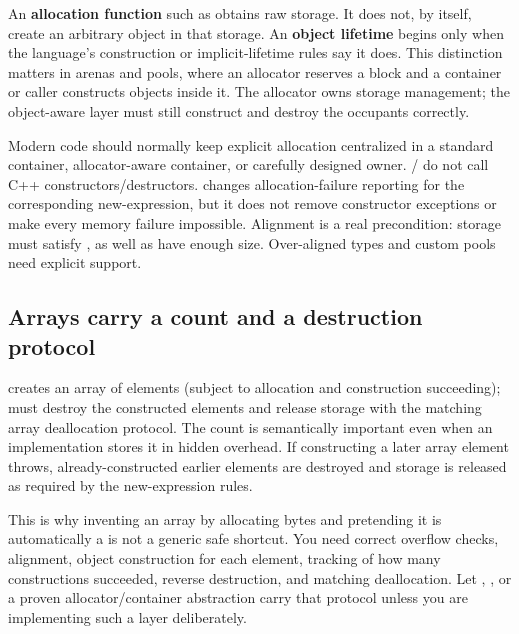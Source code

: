 An \textbf{allocation function} such as  obtains raw storage. It does not, by itself, create an arbitrary  object in that storage. An \textbf{object lifetime} begins only when the language's construction or implicit-lifetime rules say it does. This distinction matters in arenas and pools, where an allocator reserves a block and a container or caller constructs objects inside it. The allocator owns storage management; the object-aware layer must still construct and destroy the occupants correctly.

Modern code should normally keep explicit allocation centralized in a standard container, allocator-aware container, or carefully designed owner. / do not call C++ constructors/destructors.  changes allocation-failure reporting for the corresponding new-expression, but it does not remove constructor exceptions or make every memory failure impossible. Alignment is a real precondition: storage must satisfy , as well as have enough size. Over-aligned types and custom pools need explicit support.

\subsection{Arrays carry a count and a destruction protocol}\label{05-engine-i-ch004-arrays-carry-a-count-and-a-destruction-protocol}

\hypertarget{05-engine-i-ch004-arrays-carry-a-count-and-a-destruction-protocol}{}

 creates an array of  elements (subject to allocation and construction succeeding);  must destroy the constructed elements and release storage with the matching array deallocation protocol. The count is semantically important even when an implementation stores it in hidden overhead. If constructing a later array element throws, already-constructed earlier elements are destroyed and storage is released as required by the new-expression rules.

This is why inventing an array by allocating  bytes and pretending it is automatically a  is not a generic safe shortcut. You need correct overflow checks, alignment, object construction for each element, tracking of how many constructions succeeded, reverse destruction, and matching deallocation. Let , , or a proven allocator/container abstraction carry that protocol unless you are implementing such a layer deliberately.

